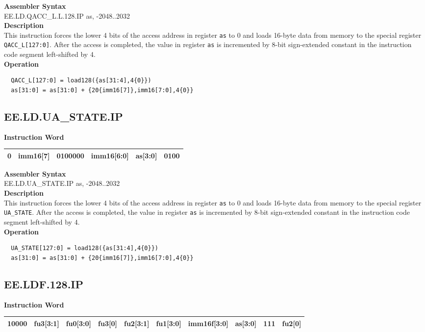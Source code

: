 \textbf{Assembler Syntax} \\
EE.LD.QACC\_L.L.128.IP as, -2048..2032 \\
\textbf{Description} \\
This instruction forces the lower 4 bits of the access address in register \lstinline{as} to 0 and loads 16-byte data from memory to the special register \lstinline{QACC_L[127:0]}. After the access is completed, the value in register \lstinline{as} is incremented by 8-bit sign-extended constant in the instruction code segment left-shifted by 4.\\
\textbf{Operation}
\begin{lstlisting}
  QACC_L[127:0] = load128({as[31:4],4{0}})
  as[31:0] = as[31:0] + {20{imm16[7]},imm16[7:0],4{0}}
\end{lstlisting}

\clearpage
\subsection{EE.LD.UA\_STATE.IP}\label{instruction:EELDUASTATEIP}
\setlength\tabcolsep{6pt}
\textbf{Instruction Word} \\
\begin{tabular}{|c|c|c|c|c|c|}
	\hline
	0 & imm16[7] & 0100000 & imm16[6:0] & as[3:0] & 0100 \\
	\hline
\end{tabular}

\textbf{Assembler Syntax} \\
EE.LD.UA\_STATE.IP as, -2048..2032 \\
\textbf{Description} \\
This instruction forces the lower 4 bits of the access address in register \lstinline{as} to 0 and loads 16-byte data from memory to the special register \lstinline{UA_STATE}. After the access is completed, the value in register \lstinline{as} is incremented by 8-bit sign-extended constant in the instruction code segment left-shifted by 4.\\
\textbf{Operation}
\begin{lstlisting}
  UA_STATE[127:0] = load128({as[31:4],4{0}})
  as[31:0] = as[31:0] + {20{imm16[7]},imm16[7:0],4{0}}
\end{lstlisting}

\clearpage
\subsection{EE.LDF.128.IP}\label{instruction:EELDF128IP}
\setlength\tabcolsep{6pt}
\textbf{Instruction Word} \\
\begin{tabular}{|c|c|c|c|c|c|c|c|c|c|}
	\hline
	10000 & fu3[3:1] & fu0[3:0] & fu3[0] & fu2[3:1] & fu1[3:0] & imm16f[3:0] & as[3:0] & 111 & fu2[0] \\
	\hline
\end{tabular}

